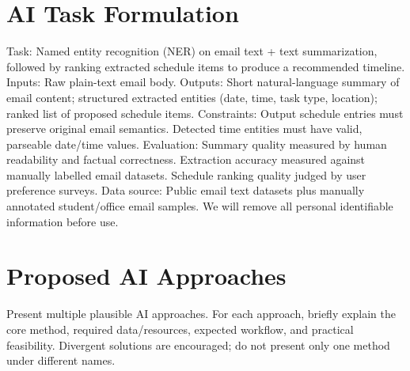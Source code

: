 \documentclass{article}
\begin{document}
\section{AI Task Formulation}
Task: Named entity recognition (NER) on email text + text summarization, followed by ranking extracted schedule items to produce a recommended timeline.
Inputs: Raw plain-text email body.
Outputs: Short natural-language summary of email content; structured extracted entities (date, time, task type, location); ranked list of proposed schedule items.
Constraints: Output schedule entries must preserve original email semantics. Detected time entities must have valid, parseable date/time values.
Evaluation: Summary quality measured by human readability and factual correctness. Extraction accuracy measured against manually labelled email datasets. Schedule ranking quality judged by user preference surveys.
Data source: Public email text datasets plus manually annotated student/office email samples. We will remove all personal identifiable information before use.

\section{Proposed AI Approaches}
Present multiple plausible AI approaches. For each approach, briefly explain the core method, required data/resources, expected workflow, and practical feasibility. Divergent solutions are encouraged; do not present only one method under different names.
\end{document}
